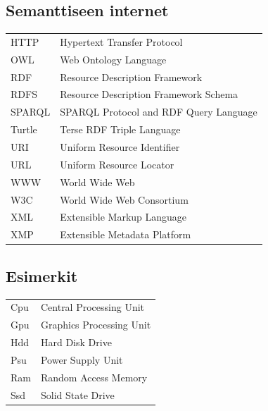 \documentclass[finnish, 12pt, a4paper, elec, utf8, pdfa, online]{aaltothesis}
\begin{document}
\thesistableofcontents



\subsection*{Semanttiseen internet}
\begin{tabular}{ll}
HTTP         & Hypertext Transfer Protocol \\
OWL          & Web Ontology Language \\
RDF          & Resource Description Framework \\
RDFS         & Resource Description Framework Schema\\
SPARQL       & SPARQL Protocol and RDF Query Language \\
Turtle       & Terse RDF Triple Language \\
URI          & Uniform Resource Identifier \\
URL          & Uniform Resource Locator \\
WWW          & World Wide Web \\
W3C          & World Wide Web Consortium \\
XML          & Extensible Markup Language \\
XMP          & Extensible Metadata Platform \\
\end{tabular}

\subsection*{Esimerkit}
\begin{tabular}{ll}
Cpu          & Central Processing Unit \\
Gpu          & Graphics Processing Unit \\
Hdd          & Hard Disk Drive \\
Psu          & Power Supply Unit \\
Ram          & Random Access Memory \\
Ssd          & Solid State Drive \\
\end{tabular}

\cleardoublepage

\end{document}
